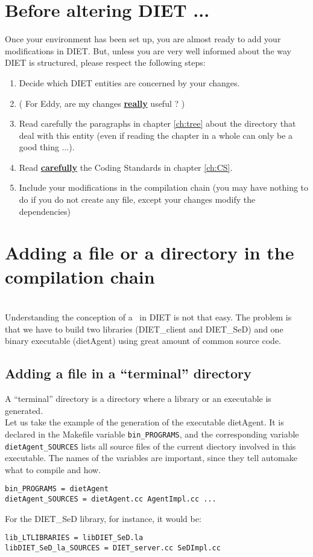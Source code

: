 \section{Before altering DIET ...}

Once your environment has been set up, you are almost ready to add your
modifications in DIET. But, unless you are very well informed about the way DIET
is structured, please respect the following steps:
\begin{enumerate}
\item Decide which DIET entities are concerned by your changes.
\item ( For Eddy, are my changes \underline{\textbf{really}} useful ? )
\item Read carefully the paragraphs in chapter \ref{ch:tree} about the
  directory that deal with this entity (even if reading the chapter in a whole
  can only be a good thing ...).
\item Read \underline{\textbf{carefully}} the Coding Standards in chapter
  \ref{ch:CS}.
\item Include your modifications in the compilation chain (you may have nothing
  to do if you do not create any file, except your changes modify the
  dependencies)
\end{enumerate}


\section{Adding a file or a directory in the compilation chain}

\\

Understanding the conception of a \makeam\ in DIET is not that easy. The problem
is that we have to build two libraries (\textsf{DIET\_client} and
\textsf{DIET\_SeD}) and one binary executable (\textsf{dietAgent}) using great
amount of common source code.

\subsection{Adding a file in a ``terminal'' directory}

A ``terminal'' directory is a directory where a library or an executable is
generated.\\

Let us take the example of the generation of the executable \textsf{dietAgent}.
It is declared in the Makefile variable \texttt{bin\_PROGRAMS}, and the
corresponding variable \texttt{dietAgent\_SOURCES} lists all source files of the
current diectory involved in this executable. The names of the variables are
important, since they tell \textsf{automake} what to compile and how.
\begin{verbatim}
bin_PROGRAMS = dietAgent
dietAgent_SOURCES = dietAgent.cc AgentImpl.cc ...
\end{verbatim}
For the \textsf{DIET\_SeD} library, for instance, it would be:
\begin{verbatim}
lib_LTLIBRARIES = libDIET_SeD.la
libDIET_SeD_la_SOURCES = DIET_server.cc SeDImpl.cc
\end{verbatim}

